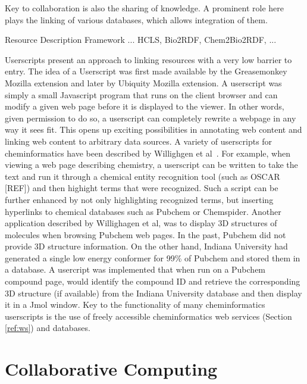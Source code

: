 \documentclass[12pt]{book}
\begin{document}
Key to collaboration is also the sharing of knowledge. A prominent role here
plays the linking of various databases, which allows integration of them.

Resource Description Framework ... HCLS, Bio2RDF, Chem2Bio2RDF, ...

Userscripts present an approach to linking resources with a very low
barrier to entry. The idea of a Userscript was first made available by
the Greasemonkey Mozilla extension and later by Ubiquity Mozilla
extension. A userscript was simply a small Javascript program that
runs on the client browser and can modify a given web page before it
is displayed to the viewer. In other words, given permission to do so,
a userscript can completely rewrite a webpage in any way it sees
fit. This opens up exciting possibilities in annotating web content
and linking web content to arbitrary data sources. A variety of
userscripts for cheminformatics have been described by Willighgen et
al~\cite{XXX}. For example, when viewing a web page describing
chemistry, a userscript can be written to take the text and run it
through a chemical entity recognition tool (such as OSCAR [REF]) and
then highight terms that were recognized. Such a script can be further
enhanced by not only highlighting recognized terms, but inserting
hyperlinks to chemical databases such as Pubchem or
Chemspider. Another application described by Willighagen et al, was to
display 3D structures of molecules when browsing Pubchem web pages. In
the past, Pubchem did not provide 3D structure information. On the
other hand, Indiana University had generated a single low energy
conformer for 99\% of Pubchem and stored them in a database. A
usercript was implemented that when run on a Pubchem compound page,
would identify the compound ID and retrieve the corresponding 3D
structure (if available) from the Indiana University database and then
display it in a Jmol window. Key to the functionality of many
cheminformatics userscripts is the use of freely accessible
cheminformatics web services (Section \ref{ref:ws}) and databases.

\section{Collaborative Computing}
\end{document}
